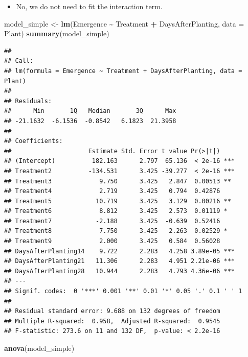 \documentclass[
]{article}
\newenvironment{Shaded}{\begin{snugshade}}{\end{snugshade}}
\newcommand{\AttributeTok}[1]{\textcolor[rgb]{0.13,0.29,0.53}{#1}}
\newcommand{\FunctionTok}[1]{\textcolor[rgb]{0.13,0.29,0.53}{\textbf{#1}}}
\newcommand{\NormalTok}[1]{#1}
\newcommand{\OtherTok}[1]{\textcolor[rgb]{0.56,0.35,0.01}{#1}}
\newcommand{\SpecialCharTok}[1]{\textcolor[rgb]{0.81,0.36,0.00}{\textbf{#1}}}
\providecommand{\tightlist}{%
  \setlength{\itemsep}{0pt}\setlength{\parskip}{0pt}}
\begin{document}
\begin{itemize}
\tightlist
\item
  No, we do not need to fit the interaction term.
\end{itemize}

\begin{Shaded}
\begin{Highlighting}[]
\NormalTok{model\_simple }\OtherTok{\textless{}{-}} \FunctionTok{lm}\NormalTok{(Emergence }\SpecialCharTok{\textasciitilde{}}\NormalTok{ Treatment }\SpecialCharTok{+}\NormalTok{ DaysAfterPlanting, }\AttributeTok{data =}\NormalTok{ Plant)}
\FunctionTok{summary}\NormalTok{(model\_simple)}
\end{Highlighting}
\end{Shaded}

\begin{verbatim}
## 
## Call:
## lm(formula = Emergence ~ Treatment + DaysAfterPlanting, data = Plant)
## 
## Residuals:
##      Min       1Q   Median       3Q      Max 
## -21.1632  -6.1536  -0.8542   6.1823  21.3958 
## 
## Coefficients:
##                     Estimate Std. Error t value Pr(>|t|)    
## (Intercept)          182.163      2.797  65.136  < 2e-16 ***
## Treatment2          -134.531      3.425 -39.277  < 2e-16 ***
## Treatment3             9.750      3.425   2.847  0.00513 ** 
## Treatment4             2.719      3.425   0.794  0.42876    
## Treatment5            10.719      3.425   3.129  0.00216 ** 
## Treatment6             8.812      3.425   2.573  0.01119 *  
## Treatment7            -2.188      3.425  -0.639  0.52416    
## Treatment8             7.750      3.425   2.263  0.02529 *  
## Treatment9             2.000      3.425   0.584  0.56028    
## DaysAfterPlanting14    9.722      2.283   4.258 3.89e-05 ***
## DaysAfterPlanting21   11.306      2.283   4.951 2.21e-06 ***
## DaysAfterPlanting28   10.944      2.283   4.793 4.36e-06 ***
## ---
## Signif. codes:  0 '***' 0.001 '**' 0.01 '*' 0.05 '.' 0.1 ' ' 1
## 
## Residual standard error: 9.688 on 132 degrees of freedom
## Multiple R-squared:  0.958,  Adjusted R-squared:  0.9545 
## F-statistic: 273.6 on 11 and 132 DF,  p-value: < 2.2e-16
\end{verbatim}

\begin{Shaded}
\begin{Highlighting}[]
\FunctionTok{anova}\NormalTok{(model\_simple)}
\end{Highlighting}
\end{Shaded}
\end{document}

